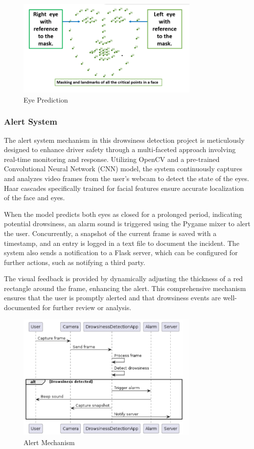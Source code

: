 \documentclass[12pt]{article}
\begin{document}
\begin{figure}[h]
\centering
\includegraphics[width=0.8\textwidth]{MM}
\caption{Eye Prediction}
\end{figure}
\FloatBarrier

\subsubsection{Alert System} 
The alert system mechanism in this drowsiness detection project is meticulously designed to enhance driver safety through a multi-faceted approach involving real-time monitoring and response. Utilizing OpenCV and a pre-trained Convolutional Neural Network (CNN) model, the system continuously captures and analyzes video frames from the user's webcam to detect the state of the eyes. Haar cascades specifically trained for facial features ensure accurate localization of the face and eyes. 

When the model predicts both eyes as closed for a prolonged period, indicating potential drowsiness, an alarm sound is triggered using the Pygame mixer to alert the user. Concurrently, a snapshot of the current frame is saved with a timestamp, and an entry is logged in a text file to document the incident. The system also sends a notification to a Flask server, which can be configured for further actions, such as notifying a third party. 

The visual feedback is provided by dynamically adjusting the thickness of a red rectangle around the frame, enhancing the alert. This comprehensive mechanism ensures that the user is promptly alerted and that drowsiness events are well-documented for further review or analysis.
\begin{figure}[h]
\centering
\includegraphics[width=0.8\textwidth]{alert}
\caption{Alert Mechanism}
\end{figure}
\FloatBarrier
\end{document}
